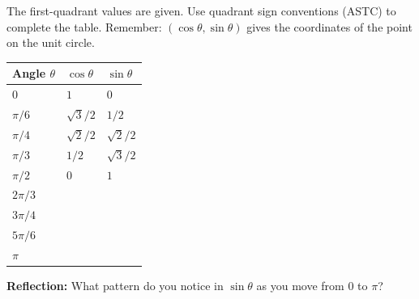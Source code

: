 \documentclass[10pt]{article}
\begin{document}
\begin{tcolorbox}[colback=white, colframe=black!40,
    title=\textbf{Tier R --- Build the Unit Circle Table},
    fonttitle=\bfseries, arc=2mm, left=3mm, right=3mm, top=2mm, bottom=2mm]
\small
The first-quadrant values are given. Use quadrant sign conventions (ASTC) to complete the table.
Remember: $(\cos\theta, \sin\theta)$ gives the coordinates of the point on the unit circle.

\vspace{0.1in}
\renewcommand{\arraystretch}{2.0}
\begin{tabularx}{\linewidth}{@{} >{\centering\arraybackslash}p{2.2cm}
    >{\centering\arraybackslash}X >{\centering\arraybackslash}X @{}}
\toprule
\textbf{Angle $\theta$} & \textbf{$\cos\theta$} & \textbf{$\sin\theta$} \\
\midrule
$0$              & $1$                     & $0$                     \\
$\pi/6$          & $\sqrt{3}/2$            & $1/2$                   \\
$\pi/4$          & $\sqrt{2}/2$            & $\sqrt{2}/2$            \\
$\pi/3$          & $1/2$                   & $\sqrt{3}/2$            \\
$\pi/2$          & $0$                     & $1$                     \\
$2\pi/3$         & \underline{\hspace{1.8cm}} & \underline{\hspace{1.8cm}} \\
$3\pi/4$         & \underline{\hspace{1.8cm}} & \underline{\hspace{1.8cm}} \\
$5\pi/6$         & \underline{\hspace{1.8cm}} & \underline{\hspace{1.8cm}} \\
$\pi$            & \underline{\hspace{1.8cm}} & \underline{\hspace{1.8cm}} \\
\bottomrule
\end{tabularx}
\renewcommand{\arraystretch}{1}

\vspace{0.1in}
\textbf{Reflection:} What pattern do you notice in $\sin\theta$ as you move from $0$ to $\pi$?

\vspace{0.45in}
\end{tcolorbox}
\end{document}
